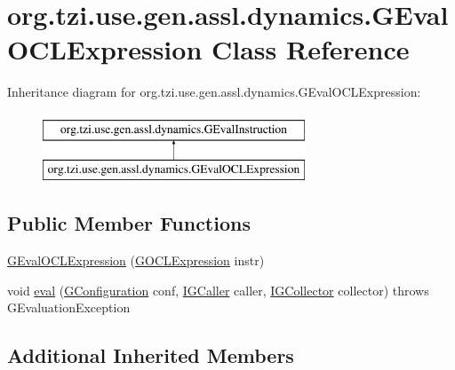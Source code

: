 \hypertarget{classorg_1_1tzi_1_1use_1_1gen_1_1assl_1_1dynamics_1_1_g_eval_o_c_l_expression}{\section{org.\-tzi.\-use.\-gen.\-assl.\-dynamics.\-G\-Eval\-O\-C\-L\-Expression Class Reference}
\label{classorg_1_1tzi_1_1use_1_1gen_1_1assl_1_1dynamics_1_1_g_eval_o_c_l_expression}
}
Inheritance diagram for org.\-tzi.\-use.\-gen.\-assl.\-dynamics.\-G\-Eval\-O\-C\-L\-Expression\-:\begin{figure}[H]
\begin{center}
\leavevmode
\includegraphics[height=2.000000cm]{classorg_1_1tzi_1_1use_1_1gen_1_1assl_1_1dynamics_1_1_g_eval_o_c_l_expression}
\end{center}
\end{figure}
\subsection*{Public Member Functions}
\begin{DoxyCompactItemize}
\item 
\hyperlink{classorg_1_1tzi_1_1use_1_1gen_1_1assl_1_1dynamics_1_1_g_eval_o_c_l_expression_a063db216de3ddc592cb277dcbb168612}{G\-Eval\-O\-C\-L\-Expression} (\hyperlink{classorg_1_1tzi_1_1use_1_1gen_1_1assl_1_1statics_1_1_g_o_c_l_expression}{G\-O\-C\-L\-Expression} instr)
\item 
void \hyperlink{classorg_1_1tzi_1_1use_1_1gen_1_1assl_1_1dynamics_1_1_g_eval_o_c_l_expression_ad0adcb8bfcc25729fb38738a36ec6280}{eval} (\hyperlink{classorg_1_1tzi_1_1use_1_1gen_1_1assl_1_1dynamics_1_1_g_configuration}{G\-Configuration} conf, \hyperlink{interfaceorg_1_1tzi_1_1use_1_1gen_1_1assl_1_1dynamics_1_1_i_g_caller}{I\-G\-Caller} caller, \hyperlink{interfaceorg_1_1tzi_1_1use_1_1gen_1_1assl_1_1dynamics_1_1_i_g_collector}{I\-G\-Collector} collector)  throws G\-Evaluation\-Exception 
\end{DoxyCompactItemize}
\subsection*{Additional Inherited Members}


